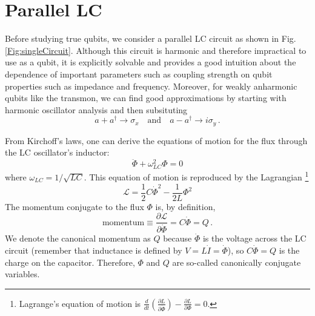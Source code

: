 \section{Parallel LC}

Before studying true qubits, we consider a parallel LC circuit as shown in Fig.\,\ref{Fig:singleCircuit}.
Although this circuit is harmonic and therefore impractical to use as a qubit, it is explicitly solvable and provides a good intuition about the dependence of important parameters such as coupling strength on qubit properties such as impedance and frequency.
Moreover, for weakly anharmonic qubits like the transmon, we can find good approximations by starting with harmonic oscillator analysis and then subsituting
\begin{equation}
a+a^\dagger \rightarrow \sigma_x \quad \textrm{and} \quad a-a^\dagger \rightarrow i \sigma_y \, .
\end{equation}

From Kirchoff's laws, one can derive the equations of motion for the flux through the LC oscillator's inductor:
\begin{equation}
\ddot{\Phi} + \omega_{LC}^2 \Phi = 0 \end{equation}
where $\omega_{LC}=1/\sqrt{LC}$.
This equation of motion is reproduced by the Lagrangian \footnote{Lagrange's equation of motion is $\frac{d}{dt}\left( \frac{\partial L}{\partial \dot{\Phi}} \right) - \frac{\partial L}{\partial \Phi} = 0$.}
\begin{equation}
\mathcal{L} = \frac{1}{2}C\dot{\Phi}^2 - \frac{1}{2L}\Phi^2
\end{equation}
The momentum conjugate to the flux $\Phi$ is, by definition,
\begin{equation}
  \text{momentum} \equiv \frac{\partial \mathcal{L}}{\partial \dot{\Phi}} = C\dot{\Phi} = Q \, .
\end{equation}
We denote the canonical momentum as $Q$ because $\dot{\Phi}$ is the voltage across the LC circuit (remember that inductance is defined by $V = L \dot{I} = \dot{\Phi}$), so $C \dot{\Phi} = Q$ is the charge on the capacitor.
Therefore, $\Phi$ and $Q$ are so-called canonically conjugate variables.

